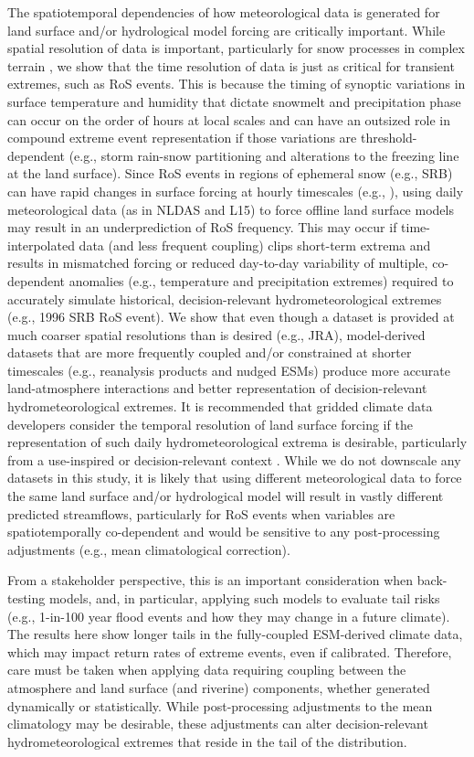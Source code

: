 \documentclass[draft]{agujournal2019}
\begin{document}
The spatiotemporal dependencies of how meteorological data is generated for land surface and/or hydrological model forcing are critically important. 
While spatial resolution of data is important, particularly for snow processes in complex terrain \citep{henn2018an,Woodburn2021}, we show that the time resolution of data is just as critical for transient extremes, such as RoS events.
This is because the timing of synoptic variations in surface temperature and humidity that dictate snowmelt and precipitation phase can occur on the order of hours at local scales and can have an outsized role in compound extreme event representation if those variations are threshold-dependent (e.g., storm rain-snow partitioning and alterations to the freezing line at the land surface).
Since RoS events in regions of ephemeral snow (e.g., SRB) can have rapid changes in surface forcing at hourly timescales (e.g., \citet{leathers1998severe}), using daily meteorological data (as in NLDAS and L15) to force offline land surface models may result in an underprediction of RoS frequency. 
This may occur if time-interpolated data (and less frequent coupling) clips short-term extrema and results in mismatched forcing or reduced day-to-day variability of multiple, co-dependent anomalies (e.g., temperature and precipitation extremes) required to accurately simulate historical, decision-relevant hydrometeorological extremes (e.g., 1996 SRB RoS event). 
We show that even though a dataset is provided at much coarser spatial resolutions than is desired (e.g., JRA), model-derived datasets that are more frequently coupled and/or constrained at shorter timescales (e.g., reanalysis products and nudged ESMs) produce more accurate land-atmosphere interactions and better representation of decision-relevant hydrometeorological extremes. 
It is recommended that gridded climate data developers consider the temporal resolution of land surface forcing if the representation of such daily hydrometeorological extrema is desirable, particularly from a use-inspired or decision-relevant context \citep{Jagannathan2021}.
While we do not downscale any datasets in this study, it is likely that using different meteorological data to force the same land surface and/or hydrological model will result in vastly different predicted streamflows, particularly for RoS events when variables are spatiotemporally co-dependent and would be sensitive to any post-processing adjustments (e.g., mean climatological correction). 

From a stakeholder perspective, this is an important consideration when back-testing models, and, in particular, applying such models to evaluate tail risks (e.g., 1-in-100 year flood events and how they may change in a future climate). 
The results here show longer tails in the fully-coupled ESM-derived climate data, which may impact return rates of extreme events, even if calibrated. 
Therefore, care must be taken when applying data requiring coupling between the atmosphere and land surface (and riverine) components, whether generated dynamically or statistically. 
While post-processing adjustments to the mean climatology may be desirable, these adjustments can alter decision-relevant hydrometeorological extremes that reside in the tail of the distribution.
\end{document}
